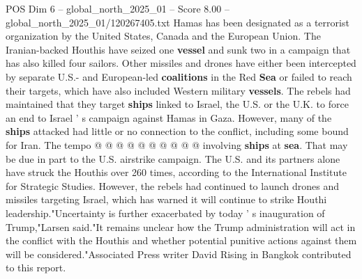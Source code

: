 \begin{textsample}{POS Dim 6 – global\_north\_2025\_01 – Score 8.00 – global\_north\_2025\_01/120267405.txt}
Hamas has been designated as a terrorist organization by the United States, Canada and the European Union.
The Iranian-backed Houthis have seized one \textbf{vessel} and sunk two in a campaign that has also killed four sailors.
Other missiles and drones have either been intercepted by separate U.S.- and European-led \textbf{coalitions} in the Red \textbf{Sea} or failed to reach their targets, which have also included Western military \textbf{vessels}.
The rebels had maintained that they target \textbf{ships} linked to Israel, the U.S. or the U.K. to force an end to Israel ' s campaign against Hamas in Gaza.
However, many of the \textbf{ships} attacked had little or no connection to the conflict, including some bound for Iran.
The tempo @ @ @ @ @ @ @ @ @ @ involving \textbf{ships} at \textbf{sea}.
That may be due in part to the U.S. airstrike campaign.
The U.S. and its partners alone have struck the Houthis over 260 times, according to the International Institute for Strategic Studies.
However, the rebels had continued to launch drones and missiles targeting Israel, which has warned it will continue to strike Houthi leadership."Uncertainty is further exacerbated by today ' s inauguration of Trump,"Larsen said."It remains unclear how the Trump administration will act in the conflict with the Houthis and whether potential punitive actions against them will be considered."Associated Press writer David Rising in Bangkok contributed to this report.

\end{textsample}

